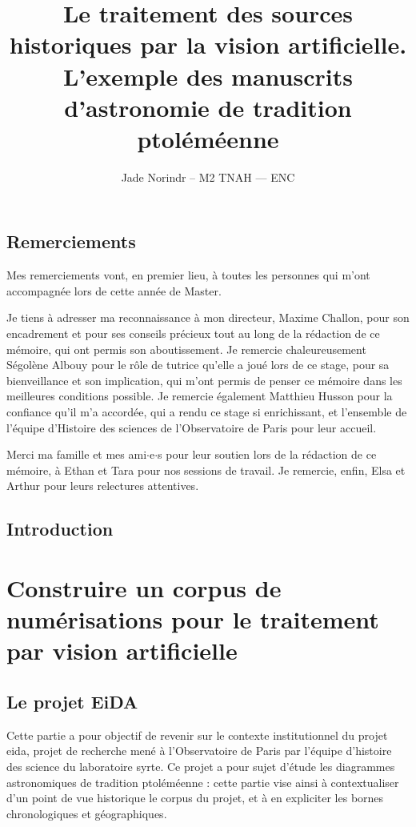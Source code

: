 \documentclass[a4paper,12pt,twoside]{book}
\author{Jade Norindr – M2 TNAH — ENC}
\title{Le traitement des sources historiques par la vision artificielle. L'exemple des manuscrits d'astronomie de tradition ptoléméenne}
\newcommand{\eida}{\gls{eida}\xspace}
\newcommand{\clearemptydoublepage}{\newpage{\pagestyle{empty}\cleardoublepage}}
\newcommand\chapterNo[1]{
  \chapter*{#1}
  \markright{\MakeUppercase{#1}}
}
\begin{document}
\onehalfspacing
\frontmatter

    

    \thispagestyle{empty}	
    \cleardoublepage
	
    
	
    \chapterNo{Remerciements}
    
    Mes remerciements vont, en premier lieu, à toutes les personnes qui m'ont accompagnée lors de cette année de Master.
    
    Je tiens à adresser ma reconnaissance à mon directeur, Maxime Challon, pour son encadrement et pour ses conseils précieux tout au long de la rédaction de ce mémoire, qui ont permis son aboutissement. Je remercie chaleureusement Ségolène Albouy pour le rôle de tutrice qu'elle a joué lors de ce stage, pour sa bienveillance et son implication, qui m'ont permis de penser ce mémoire dans les meilleures conditions possible. Je remercie également Matthieu Husson pour la confiance qu'il m'a accordée, qui a rendu ce stage si enrichissant, et l'ensemble de l'équipe d'Histoire des sciences de l'Observatoire de Paris pour leur accueil.
    
    Merci ma famille et mes ami$\cdot$e$\cdot$s pour leur soutien lors de la rédaction de ce mémoire, à Ethan et Tara pour nos sessions de travail. Je remercie, enfin, Elsa et Arthur pour leurs relectures attentives.

    \printbibliography[keyword={DH},title={Humanités numériques}]
    \clearemptydoublepage
    \printbibliography[keyword={ml},title={\textit{Machine learning}, \textit{deep learning} et vision artificielle}]
    \clearemptydoublepage
    \printbibliography[keyword={technique},title={Documentation technique et méthode}]
    \clearemptydoublepage
    \printbibliography[keyword={astronomie},title={Histoire de l'astronomie}]
    \clearemptydoublepage
    
    \chapterNo{Introduction}

    \clearemptydoublepage

\mainmatter

    \part{Construire un corpus de numérisations pour le traitement par vision artificielle}
        \chapter{Le projet EiDA}
        Cette partie a pour objectif de revenir sur le contexte institutionnel du projet \eida, projet de recherche mené à l'Observatoire de Paris par l'équipe d'histoire des science du laboratoire \acrshort{syrte}. Ce projet a pour sujet d'étude les diagrammes astronomiques de tradition ptoléméenne : cette partie vise ainsi à contextualiser d'un point de vue historique le corpus du projet, et à en expliciter les bornes chronologiques et géographiques.
        
\end{document}
